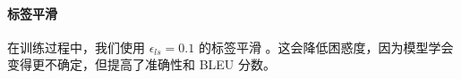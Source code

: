 


\paragraph{标签平滑} 在训练过程中，我们使用 $\epsilon_{ls}=0.1$ 的标签平滑 \citep{DBLP:journals/corr/SzegedyVISW15}。这会降低困惑度，因为模型学会变得更不确定，但提高了准确性和 BLEU 分数。

